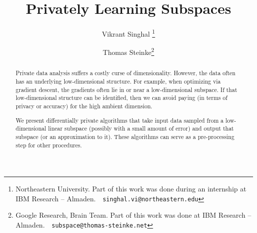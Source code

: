 \documentclass[letterpaper,11pt]{article}
\title{Privately Learning Subspaces}
\author{Vikrant Singhal
    \thanks{Northeastern University. Part of this work was done during an internship at IBM Research -- Almaden.~\dotfill~\texttt{singhal.vi@northeastern.edu}}
    \and
    Thomas Steinke\thanks{Google Research, Brain Team. Part of this work was done at IBM Research --
    Almaden.~\dotfill~\texttt{subspace@thomas-steinke.net}}}
\date{}
\begin{document}
\maketitle

\begin{abstract}
    Private data analysis suffers a costly curse of dimensionality. However, the data often has an underlying low-dimensional structure. For example, when optimizing via gradient descent, the gradients often lie in or near a low-dimensional subspace. If that low-dimensional structure can be identified, then we can avoid paying (in terms of privacy or accuracy) for the high ambient dimension. 
    
    We present differentially private algorithms that take input data sampled from a low-dimensional linear subspace (possibly with a small amount of error) and output that subspace (or an approximation to it). These algorithms can serve as a pre-processing step for other procedures.
\end{abstract}









{}
%
%

\printbibliography


%
\end{document}
